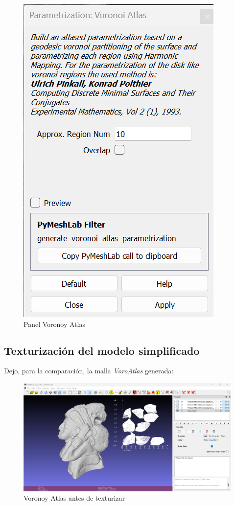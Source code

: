 \documentclass[options]{article}
\begin{document}
\begin{figure}[H]
    \centering
    \includegraphics[scale=0.5]{images/parametrizacion_01.png}
    \caption{Panel Voronoy Atlas}
\end{figure}

\subsection{Texturización del modelo simplificado}

Dejo, para la comparación, la malla \textit{VoroAtlas} generada:

\begin{figure}[H]
    \centering
    \includegraphics[scale=0.34]{images/textura_01.png}
    \caption{Voronoy Atlas antes de texturizar}
\end{figure}
\end{document}
